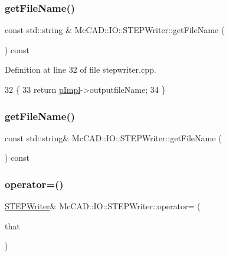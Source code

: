 \subsubsection{\texorpdfstring{get\+File\+Name()}{getFileName()}\hspace{0.1cm}{\footnotesize\ttfamily [1/2]}}
{\footnotesize\ttfamily const std\+::string \& Mc\+C\+A\+D\+::\+I\+O\+::\+S\+T\+E\+P\+Writer\+::get\+File\+Name (\begin{DoxyParamCaption}{ }\end{DoxyParamCaption}) const}



Definition at line 32 of file stepwriter.\+cpp.


\begin{DoxyCode}
32                                     \{
33   \textcolor{keywordflow}{return} \hyperlink{classMcCAD_1_1IO_1_1STEPWriter_af607286b2a18648c14ece6b8bc103db4}{pImpl}->outputfileName;
34 \}
\end{DoxyCode}
\mbox{\label{classMcCAD_1_1IO_1_1STEPWriter_ae2f6dfdcd56327cc9423df2fe22b8195}} 
\subsubsection{\texorpdfstring{get\+File\+Name()}{getFileName()}\hspace{0.1cm}{\footnotesize\ttfamily [2/2]}}
{\footnotesize\ttfamily const std\+::string\& Mc\+C\+A\+D\+::\+I\+O\+::\+S\+T\+E\+P\+Writer\+::get\+File\+Name (\begin{DoxyParamCaption}{ }\end{DoxyParamCaption}) const}

\mbox{\label{classMcCAD_1_1IO_1_1STEPWriter_a2a12284f8e777a7663cda0d0a63b812a}} 
\subsubsection{\texorpdfstring{operator=()}{operator=()}\hspace{0.1cm}{\footnotesize\ttfamily [1/4]}}
{\footnotesize\ttfamily \hyperlink{classMcCAD_1_1IO_1_1STEPWriter}{S\+T\+E\+P\+Writer}\& Mc\+C\+A\+D\+::\+I\+O\+::\+S\+T\+E\+P\+Writer\+::operator= (\begin{DoxyParamCaption}\item[{const \hyperlink{classMcCAD_1_1IO_1_1STEPWriter}{S\+T\+E\+P\+Writer} \&}]{that }\end{DoxyParamCaption})}

